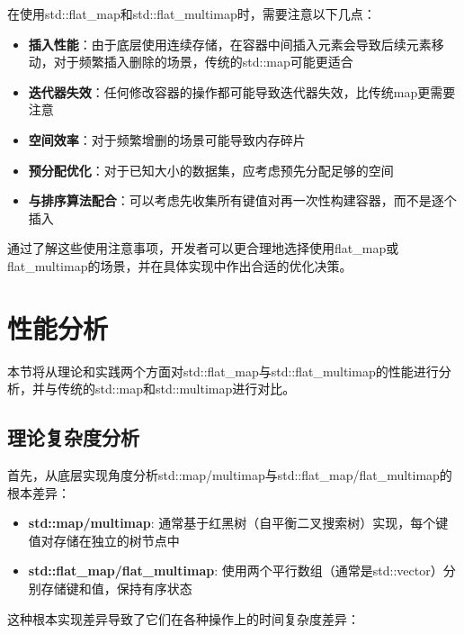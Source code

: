 \documentclass[a4paper, 12pt]{article}
\begin{document}
在使用std::flat\_map和std::flat\_multimap时，需要注意以下几点：

\begin{itemize}
    \setlength{\itemsep}{0pt}
    \setlength{\parsep}{0pt}
    \setlength{\parskip}{0pt}
    \item \textbf{插入性能}：由于底层使用连续存储，在容器中间插入元素会导致后续元素移动，对于频繁插入删除的场景，传统的std::map可能更适合
    \item \textbf{迭代器失效}：任何修改容器的操作都可能导致迭代器失效，比传统map更需要注意
    \item \textbf{空间效率}：对于频繁增删的场景可能导致内存碎片
    \item \textbf{预分配优化}：对于已知大小的数据集，应考虑预先分配足够的空间
    \item \textbf{与排序算法配合}：可以考虑先收集所有键值对再一次性构建容器，而不是逐个插入
\end{itemize}

通过了解这些使用注意事项，开发者可以更合理地选择使用flat\_map或flat\_multimap的场景，并在具体实现中作出合适的优化决策。

\section{性能分析}

本节将从理论和实践两个方面对std::flat\_map与std::flat\_multimap的性能进行分析，并与传统的std::map和std::multimap进行对比。

\subsection{理论复杂度分析}

首先，从底层实现角度分析std::map/multimap与std::flat\_map/flat\_multimap的根本差异：

\begin{itemize}
    \setlength{\itemsep}{0pt}
    \setlength{\parsep}{0pt}
    \setlength{\parskip}{0pt}
    \item \textbf{std::map/multimap}: 通常基于红黑树（自平衡二叉搜索树）实现，每个键值对存储在独立的树节点中
    \item \textbf{std::flat\_map/flat\_multimap}: 使用两个平行数组（通常是std::vector）分别存储键和值，保持有序状态
\end{itemize}

这种根本实现差异导致了它们在各种操作上的时间复杂度差异：
\end{document}
